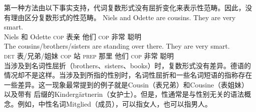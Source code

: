 第一种方法由以下事实支持，代词复数形式没有屈折变化来表示性范畴。因此，没有理由区分复数形式的性范畴。
\eal
\ex 
\gll Niels and Odette are cousins. They are very smart.\\
	Niels 和 Odette \textsc{cop} 表亲 他们 \textsc{cop} 非常 聪明\\
\ex 
\gll The cousins/brothers/sisters are standing over there. They are very smart.\\
	\textsc{det} 表/兄弟/姐妹 \textsc{cop} 站 \textsc{prep} 那里 他们 \textsc{cop} 非常 聪明\\
\zl
当涉及到名词性屈折（brothers、sisters、books）时，复数形式没有差异。德语的情况却不是这样。当涉及到所指的性别时，名词性屈折和一些名词短语的指称存在一些差异。这一现象最常提到的例子就是Cousin（表兄弟）和Cousine（表姐妹）以及带有 后缀的Kindergärtnerin（女护士）。但是，性通常是与性别无关的语法概念。例如，中性名词Mitglied（成员），可以指女人，也可以指男人。

